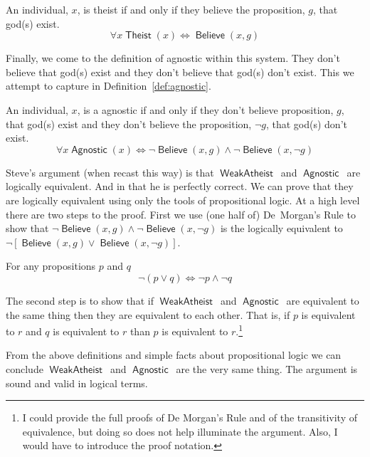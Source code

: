 \documentclass[12pt]{article}
\providecommand{\land}{\wedge}
\providecommand{\lor}{\vee}
\providecommand{\liff}{\iff}
\providecommand{\lnot}{\neg}
\providecommand{\lall}{\forall}
\newcommand{\rel}[1]{\ensuremath{\mathop{\mathsf{#1}}}}
\newcommand{\rlbelieve}{\rel{Believe}}
\newcommand{\rlwa}{\rel{WeakAtheist}}
\newcommand{\rlagno}{\rel{Agnostic}}
\begin{document}
\begin{definition}[Theist]\label{def:theist}
    An individual, $x$, is theist if and only if they believe the proposition, $g$, that god(s) exist.
    \[
        \lall x \rel{Theist}(x) \liff \rlbelieve(x, g)
    \]
\end{definition}

Finally, we come to the definition of agnostic within this system. They don't believe that god(s) exist and they don't believe that god(s) don't exist.
This we attempt to capture in Definition~\ref{def:agnostic}.

\begin{definition}[Agnostic]\label{def:agnostic}
    An individual, $x$, is a agnostic if and only if they don't believe proposition, $g$, that god(s) exist and they don't believe the proposition, $\lnot g$, that god(s) don't exist.
    \[
        \lall x \rlagno(x) \liff
          \lnot \rlbelieve(x, g) \land \lnot\rlbelieve(x, \lnot g)
    \]
\end{definition}

Steve's argument (when recast this way) is that \rlwa\ and \rlagno\ are logically equivalent.
And in that he is perfectly correct. We can prove that they are logically equivalent using only the tools of propositional logic.
At a high level there are two steps to the proof. First we use (one half of) De~Morgan's Rule to show that $\lnot \rlbelieve(x, g) \land \lnot\rlbelieve(x, \lnot g)$ is the logically equivalent to $\lnot\left[\rlbelieve(x, g) \lor \rlbelieve(x, \lnot g)\right]$.

\begin{theorem}
    For any propositions $p$ and $q$ 
    \[
        \lnot\left(p \lor q\right) \liff \lnot p \land \lnot q
    \]  
\end{theorem}


The second step is to show that if \rlwa\ and \rlagno\ are equivalent to the same thing then they are equivalent to each other. That is, if $p$ is equivalent to $r$ and $q$ is equivalent to $r$ than $p$ is equivalent to $r$.\footnote{I could provide the full proofs of De Morgan's Rule and of the transitivity of equivalence, but doing so does not help illuminate the argument. Also, I would have to introduce the proof notation.}

From the above definitions and simple facts about propositional logic we can conclude \rlwa\ and \rlagno\ are the very same thing. The argument is sound and valid in logical terms.
\end{document}
